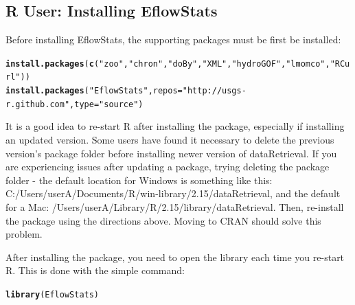 \documentclass[a4paper,11pt]{article}\usepackage[]{graphicx}\usepackage[]{color}
\makeatletter
\newcommand{\hlstr}[1]{\textcolor[rgb]{0.192,0.494,0.8}{#1}}%
\newcommand{\hlstd}[1]{\textcolor[rgb]{0.345,0.345,0.345}{#1}}%
\newcommand{\hlkwc}[1]{\textcolor[rgb]{0.333,0.667,0.333}{#1}}%
\newcommand{\hlkwd}[1]{\textcolor[rgb]{0.737,0.353,0.396}{\textbf{#1}}}%
\newenvironment{kframe}{%
 \def\at@end@of@kframe{}%
 \ifinner\ifhmode%
  \def\at@end@of@kframe{\end{minipage}}%
  \begin{minipage}{\columnwidth}%
 \fi\fi%
 \def\FrameCommand##1{\hskip\@totalleftmargin \hskip-\fboxsep
 \colorbox{shadecolor}{##1}\hskip-\fboxsep
     \hskip-\linewidth \hskip-\@totalleftmargin \hskip\columnwidth}%
 \MakeFramed {\advance\hsize-\width
   \@totalleftmargin\z@ \linewidth\hsize
   \@setminipage}}%
 {\par\unskip\endMakeFramed%
 \at@end@of@kframe}
\newenvironment{knitrout}{}{} %
\makeatother
\begin{document}
\FloatBarrier
\clearpage
\subsection{R User: Installing EflowStats}
Before installing EflowStats, the supporting packages must be first be installed:

\begin{knitrout}
\color{fgcolor}\begin{kframe}
\begin{alltt}
\hlkwd{install.packages}\hlstd{(}\hlkwd{c}\hlstd{(}\hlstr{"zoo"}\hlstd{,}\hlstr{"chron"}\hlstd{,}\hlstr{"doBy"}\hlstd{,}\hlstr{"XML"}\hlstd{,}\hlstr{"hydroGOF"}\hlstd{,}\hlstr{"lmomco"}\hlstd{,}\hlstr{"RCurl"}\hlstd{))}
\hlkwd{install.packages}\hlstd{(}\hlstr{"EflowStats"}\hlstd{,}\hlkwc{repos}\hlstd{=}\hlstr{"http://usgs-r.github.com"}\hlstd{,}\hlkwc{type}\hlstd{=}\hlstr{"source"}\hlstd{)}
\end{alltt}
\end{kframe}
\end{knitrout}

It is a good idea to re-start R after installing the package, especially if installing an updated version. Some users have found it necessary to delete the previous version's package folder before installing newer version of dataRetrieval. If you are experiencing issues after updating a package, trying deleting the package folder - the default location for Windows is something like this: C:/Users/userA/Documents/R/win-library/2.15/dataRetrieval, and the default for a Mac: 
/Users/userA/Library/R/2.15/library/dataRetrieval. Then, re-install the package using the directions above. Moving to CRAN should solve this problem.

After installing the package, you need to open the library each time you re-start R.  This is done with the simple command:
\begin{knitrout}
\color{fgcolor}\begin{kframe}
\begin{alltt}
\hlkwd{library}\hlstd{(EflowStats)}
\end{alltt}
\end{kframe}
\end{knitrout}

\clearpage
\end{document}
